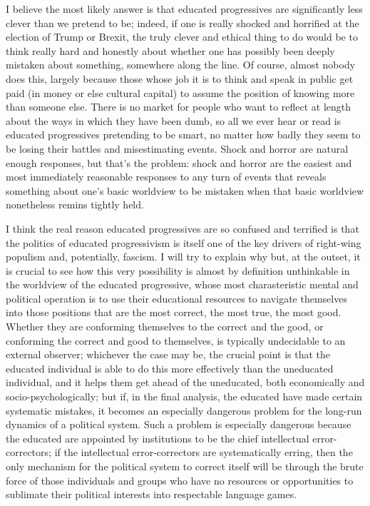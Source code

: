 \documentclass[a4paper,12pt,margin=.5in]{article}
\begin{document}
I believe the most likely answer is that educated progressives are
significantly less clever than we pretend to be; indeed, if one is
really shocked and horrified at the election of Trump or Brexit, the
truly clever and ethical thing to do would be to think really hard and
honestly about whether one has possibly been deeply mistaken about
something, somewhere along the line. Of course, almost nobody does this,
largely because those whose job it is to think and speak in public get
paid (in money or else cultural capital) to assume the position of
knowing more than someone else. There is no market for people who want
to reflect at length about the ways in which they have been dumb, so all
we ever hear or read is educated progressives pretending to be smart, no
matter how badly they seem to be losing their battles and misestimating
events. Shock and horror are natural enough responses, but that's the
problem: shock and horror are the easiest and most immediately
reasonable responses to any turn of events that reveals something about
one's basic worldview to be mistaken when that basic worldview
nonetheless remins tightly held.

I think the real reason educated progressives are so confused and
terrified is that the politics of educated progressivism is itself one
of the key drivers of right-wing populism and, potentially, fascism. I
will try to explain why but, at the outset, it is crucial to see how
this very possibility is almost by definition unthinkable in the
worldview of the educated progressive, whose most charasteristic mental
and political operation is to use their educational resources to
navigate themselves into those positions that are the most correct, the
most true, the most good. Whether they are conforming themselves to the
correct and the good, or conforming the correct and good to themselves,
is typically undecidable to an external observer; whichever the case may
be, the crucial point is that the educated individual is able to do this
more effectively than the uneducated individual, and it helps them get
ahead of the uneducated, both economically and socio-psychologically;
but if, in the final analysis, the educated have made certain systematic
mistakes, it becomes an especially dangerous problem for the long-run
dynamics of a political system. Such a problem is especially dangerous
because the educated are appointed by institutions to be the chief
intellectual error-correctors; if the intellectual error-correctors are
systematically erring, then the only mechanism for the political system
to correct itself will be through the brute force of those individuals
and groups who have no resources or opportunities to sublimate their
political interests into respectable language games.
\end{document}
